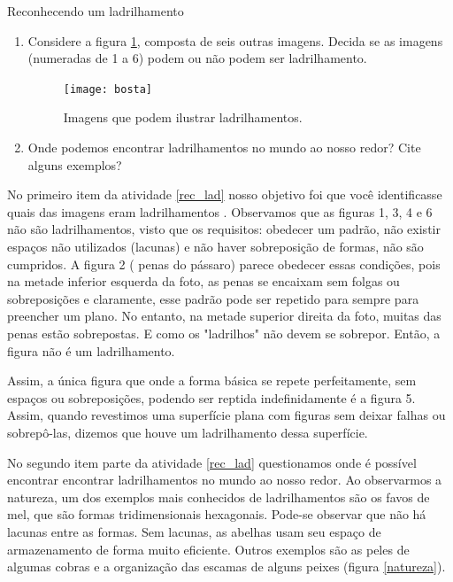 \begin{task}{Reconhecendo um ladrilhamento} \label{rec_lad}
\begin{enumerate}
\item Considere  a figura \ref{ladr12}, composta de seis outras imagens. Decida se as imagens (numeradas de 1 a 6) podem ou não podem ser  ladrilhamento.

\begin{figure}[H]
\centering
\texttt{[image: bosta]}
\label{ladr12}
\caption{Imagens que podem ilustrar ladrilhamentos.}
\end{figure}

\item Onde podemos encontrar ladrilhamentos no mundo ao nosso redor? Cite alguns exemplos?

\end{enumerate}

\end{task}




No primeiro item da atividade \ref{rec_lad} nosso objetivo foi que você identificasse  quais das imagens eram ladrilhamentos .
Observamos que as figuras 1, 3, 4 e 6 não são ladrilhamentos, visto que os requisitos:  obedecer um padrão, não existir espaços não utilizados (lacunas) e não haver sobreposição de formas, não são cumpridos. A figura 2 ( penas do pássaro) parece obedecer essas condições, pois na metade inferior esquerda da foto, as penas se encaixam sem folgas ou sobreposições e claramente, esse padrão pode ser repetido para sempre para preencher um plano. No entanto, na metade superior direita da foto, muitas das penas estão sobrepostas. E como os "ladrilhos" não devem se sobrepor. Então, a figura não é um ladrilhamento.

Assim, a única figura que onde a forma básica se repete perfeitamente, sem espaços ou sobreposições, podendo ser reptida indefinidamente é a figura 5.
Assim,  quando revestimos uma superfície plana com figuras sem deixar falhas ou sobrepô-las, dizemos que houve um ladrilhamento dessa superfície. 

No segundo item parte da  atividade \ref{rec_lad} questionamos onde é possível encontrar encontrar ladrilhamentos no mundo ao nosso redor. 
Ao observarmos a natureza, um dos exemplos mais conhecidos de ladrilhamentos são os favos de mel, que são formas tridimensionais hexagonais. Pode-se observar que não há lacunas entre as formas. Sem lacunas, as abelhas usam seu espaço de armazenamento de forma muito eficiente. Outros exemplos são as peles de algumas cobras e a organização das escamas de alguns peixes (figura \ref{natureza}).


